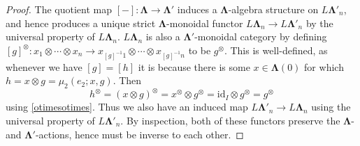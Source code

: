\documentclass{amsbook} %
\newcommand{\id}{\textrm{id}}
\newcommand{\ML}{\mathbf{\Lambda}}
\numberwithin{section}{chapter}
\begin{document}
\begin{proof}

The quotient map $[-]:\ML \to \ML'$ induces a $\ML$-algebra structure on $L\ML'_n$, and hence produces a unique strict $\ML$-monoidal functor $L\ML_n \to L\ML'_n$ by the universal property of $L\ML_n$. $L\ML_n$ is also a $\ML'$-monoidal category by defining $[g]^{\otimes} : x_1 \otimes \cdots \otimes x_n \to x_{[g]^{-1}1} \otimes \cdots \otimes x_{[g]^{-1}n}$ to be $g^{\otimes}$. This is well-defined, as whenever we have $[g] = [h]$ it is because there is some $x \in \ML(0)$ for which $h = x \otimes g = \mu_2(e_2; x, g)$. Then
\[
h^{\otimes} = (x \otimes g)^{\otimes} = x^{\otimes} \otimes g^{\otimes} = \id_I \otimes g^{\otimes} = g^{\otimes}
\]
using \cref{otimesotimes}. Thus we also have an induced map $L\ML'_n \to L\ML_n$ using the universal property of $L\ML'_n$. By inspection, both of these functors preserve the $\ML$- and $\ML'$-actions, hence must be inverse to each other.



\end{proof}
\end{document}
